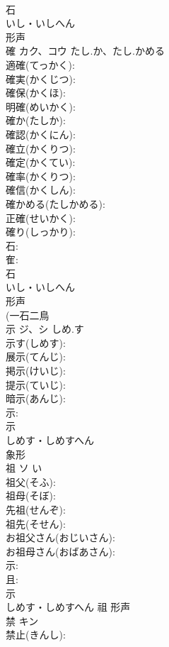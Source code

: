 \documentclass[8pt]{extreport}
\begin{document}
\begin{CJK}{UTF8}{min}
\\	石	
\\	いし・いしへん	
\\	形声 
\\	確	カク、コウ	たし.か、たし.かめる		
\\	適確(てっかく): 
\\	確実(かくじつ): 
\\	確保(かくほ): 
\\	明確(めいかく): 
\\	確か(たしか): 
\\	確認(かくにん): 
\\	確立(かくりつ): 
\\	確定(かくてい): 
\\	確率(かくりつ): 
\\	確信(かくしん): 
\\	確かめる(たしかめる): 
\\	正確(せいかく): 
\\	確り(しっかり): 
\\	石: 
\\	隺: 
\\	石	
\\	いし・いしへん	
\\	形声 
\\	(一石二鳥 
\\	示	ジ、シ	しめ.す		
\\	示す(しめす): 
\\	展示(てんじ): 
\\	掲示(けいじ): 
\\	提示(ていじ): 
\\	暗示(あんじ): 
\\	示: 
\\	示	
\\	しめす・しめすへん	
\\	象形 
\\	祖	ソ		い	
\\	祖父(そふ): 
\\	祖母(そぼ): 
\\	先祖(せんぞ): 
\\	祖先(そせん): 
\\	お祖父さん(おじいさん): 
\\	お祖母さん(おばあさん): 
\\	示: 
\\	且: 
\\	示	
\\	しめす・しめすへん	祖	形声 
\\	禁	キン			
\\	禁止(きんし): 

\end{CJK}
\end{document}

